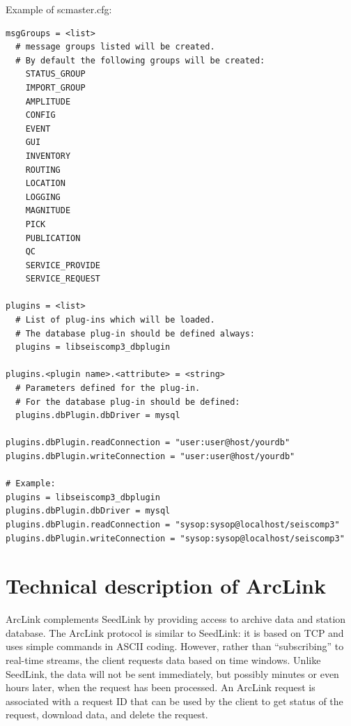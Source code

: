 \documentclass[11pt,a4paper,titlepage]{article}
\begin{document}
Example of scmaster.cfg:
\begin{verbatim}
msgGroups = <list>
  # message groups listed will be created.
  # By default the following groups will be created:
	STATUS_GROUP
	IMPORT_GROUP
	AMPLITUDE
	CONFIG
	EVENT
	GUI
	INVENTORY
	ROUTING
	LOCATION
	LOGGING
	MAGNITUDE
	PICK
	PUBLICATION
	QC
	SERVICE_PROVIDE
	SERVICE_REQUEST

plugins = <list>
  # List of plug-ins which will be loaded.
  # The database plug-in should be defined always:
  plugins = libseiscomp3_dbplugin

plugins.<plugin name>.<attribute> = <string>
  # Parameters defined for the plug-in.
  # For the database plug-in should be defined:
  plugins.dbPlugin.dbDriver = mysql

plugins.dbPlugin.readConnection = "user:user@host/yourdb"
plugins.dbPlugin.writeConnection = "user:user@host/yourdb"

# Example:
plugins = libseiscomp3_dbplugin
plugins.dbPlugin.dbDriver = mysql
plugins.dbPlugin.readConnection = "sysop:sysop@localhost/seiscomp3"
plugins.dbPlugin.writeConnection = "sysop:sysop@localhost/seiscomp3"
\end{verbatim}

\newpage


\section{Technical description of ArcLink}

ArcLink complements SeedLink by providing access to archive data and
station database. The ArcLink protocol is similar to SeedLink: it is based
on TCP and uses simple commands in ASCII coding. However, rather than
``subscribing'' to real-time streams, the client requests data based on
time windows. Unlike SeedLink, the data will not be sent immediately, but
possibly minutes or even hours later, when the request has been processed.
An ArcLink request is associated with a request ID that can be used by the
client to get status of the request, download data, and delete the request.
\end{document}
